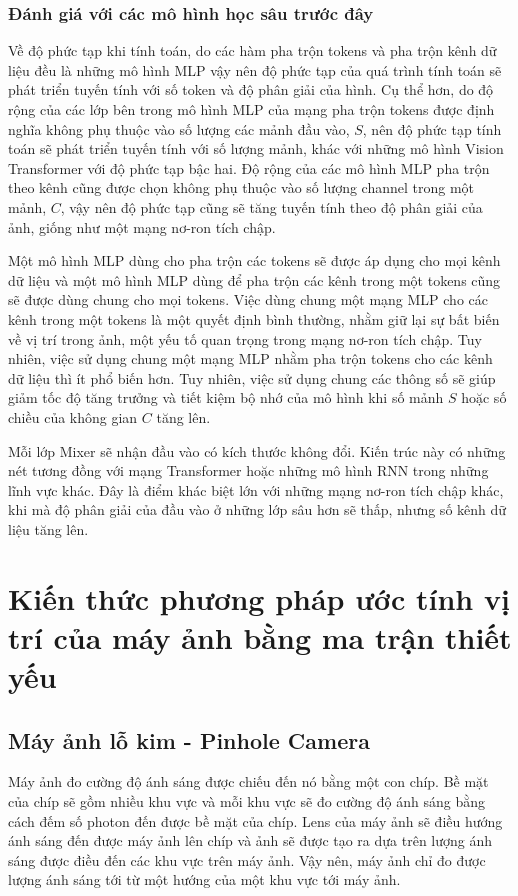 \subsubsection*{Đánh giá với các mô hình học sâu trước đây}
Về độ phức tạp khi tính toán, do các hàm pha trộn tokens và pha trộn kênh dữ liệu đều là những mô hình MLP vậy nên độ phức tạp của quá trình tính toán sẽ phát triển tuyến tính với số token và độ phân giải của hình. Cụ thể hơn, do độ rộng của các lớp bên trong mô hình MLP của mạng pha trộn tokens được định nghĩa không phụ thuộc vào số lượng các mảnh đầu vào, $S$, nên độ phức tạp tính toán sẽ phát triển tuyến tính với số lượng mảnh, khác với những mô hình Vision Transformer với độ phức tạp bậc hai. Độ rộng của các mô hình MLP pha trộn theo kênh cũng được chọn không phụ thuộc vào số lượng channel trong một mảnh, $C$, vậy nên độ phức tạp cũng sẽ tăng tuyến tính theo độ phân giải của ảnh, giống như một mạng nơ-ron tích chập.

Một mô hình MLP dùng cho pha trộn các tokens sẽ được áp dụng cho mọi kênh dữ liệu và một mô hình MLP dùng để pha trộn các kênh trong một tokens cũng sẽ được dùng chung cho mọi tokens. Việc dùng chung một mạng MLP cho các kênh trong một tokens là một quyết định bình thường, nhằm giữ lại sự bất biến về vị trí trong ảnh, một yếu tố quan trọng trong mạng nơ-ron tích chập. Tuy nhiên, việc sử dụng chung một mạng MLP nhằm pha trộn tokens cho các kênh dữ liệu thì ít phổ biến hơn. Tuy nhiên, việc sử dụng chung các thông số sẽ giúp giảm tốc độ tăng trưởng và tiết kiệm bộ nhớ của mô hình khi số mảnh $S$ hoặc số chiều của không gian $C$ tăng lên.

Mỗi lớp Mixer sẽ nhận đầu vào có kích thước không đổi. Kiến trúc này có những nét tương đồng với mạng Transformer hoặc những mô hình RNN trong những lĩnh vực khác. Đây là điểm khác biệt lớn với những mạng nơ-ron tích chập khác, khi mà độ phân giải của đầu vào ở những lớp sâu hơn sẽ thấp, nhưng số kênh dữ liệu tăng lên. 


\section{Kiến thức phương pháp ước tính vị trí của máy ảnh bằng ma trận thiết yếu}
\subsection{Máy ảnh lỗ kim - Pinhole Camera}
Máy ảnh đo cường độ ánh sáng được chiếu đến nó bằng một con chíp. Bề mặt của chíp sẽ gồm nhiều khu vực và mỗi khu vực sẽ đo cường độ ánh sáng bằng cách đếm số photon đến được bề mặt của chíp. Lens của máy ảnh sẽ điều hướng ánh sáng đến được máy ảnh lên chíp và ảnh sẽ được tạo ra dựa trên lượng ánh sáng được điều đến các khu vực trên máy ảnh. Vậy nên, máy ảnh chỉ đo được lượng ánh sáng tới từ một hướng của một khu vực tới máy ảnh.


